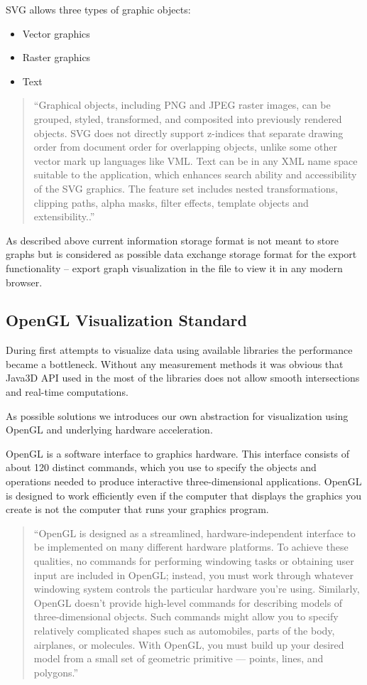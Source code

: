 SVG allows three types of graphic objects:
\begin{itemize}
\item Vector graphics
\item Raster graphics
\item Text
\end{itemize}

\begin{quotation}
``Graphical objects, including PNG and JPEG raster images, can be grouped, styled, transformed,
and composited into previously rendered objects. SVG does not directly support z-indices
that separate drawing order from document order for overlapping objects, unlike some other vector mark up languages like VML.
Text can be in any XML name space suitable to the application, which enhances search ability and accessibility of the SVG graphics.
The feature set includes nested transformations, clipping paths, alpha masks, filter effects, template objects and extensibility..''~\cite{SVG}
\end{quotation}

As described above current information storage format is not meant to store graphs but is considered as possible data exchange storage format for the export functionality -- export graph visualization in the file to view it in any modern browser.

\subsection{OpenGL Visualization Standard}
\label{sec:opengl}
During first attempts to visualize data using available libraries the performance became a bottleneck. Without any measurement methods it was obvious that Java3D API used in the most of the libraries does not allow smooth intersections and real-time computations.


As possible solutions we introduces our own abstraction for visualization using OpenGL and underlying hardware acceleration.


OpenGL is a software interface to graphics hardware. This interface consists of about 120 distinct commands,
which you use to specify the objects and operations needed to produce interactive three-dimensional applications.
OpenGL is designed to work efficiently even if the computer that displays the graphics you create is not the computer that runs your graphics program.

\begin{quotation}
``OpenGL is designed as a streamlined, hardware-independent interface to be implemented on many different hardware platforms.
To achieve these qualities, no commands for performing windowing tasks or obtaining user input are included in OpenGL;
instead, you must work through whatever windowing system controls the particular hardware you're using.
Similarly, OpenGL doesn't provide high-level commands for describing models of three-dimensional objects.
Such commands might allow you to specify relatively complicated shapes such as automobiles, parts of the body, airplanes,
or molecules. With OpenGL, you must build up your desired model from a small set of geometric primitive --- points,
lines, and polygons.''~\cite{THE_RED_BOOK}
\end{quotation}

